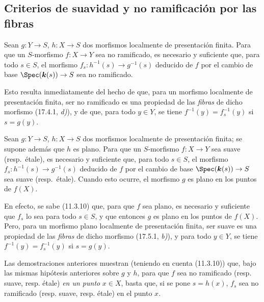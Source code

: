 \subsection{Criterios de suavidad y no ramificación por las fibras}
\label{subsection:IV.17.8}
\label{IV.17.8}

\begin{proposition}[17.8.1]
\label{IV.17.8.1}
Sean $g:Y\to S$, $h:X\to S$ dos morfismos localmente de presentación finita. Para que un $S$-morfismo $f:X\to Y$ sea no ramificado, es necesario y suficiente que, para todo $s\in S$, el morfismo $f_s:h^{-1}(s)\to g^{-1}(s)$ deducido de $f$ por el cambio de base $\Spec(\boldsymbol{k}(s))\to S$ sea no ramificado.
\end{proposition}

Esto resulta inmediatamente del hecho de que, para un morfismo localmente de presentación finita, ser no ramificado es una propiedad de las \emph{fibras} de dicho morfismo (17.4.1, \emph{d)}), y de que, para todo $y\in Y$, se tiene $f^{-1}(y)=f_s^{-1}(y)$ si $s=g(y)$.

\begin{proposition}[17.8.2]
\label{IV.17.8.2}
Sean $g:Y\to S$, $h:X\to S$ dos morfismos localmente de presentación finita; se supone además que $h$ es \textup{plano}. Para que un $S$-morfismo $f:X\to Y$ sea suave \textup{(resp.}\ étale\textup{)}, es necesario y suficiente que, para todo $s\in S$, el morfismo $f_s:h^{-1}(s)\to g^{-1}(s)$ deducido de $f$ por el cambio de base $\Spec(\boldsymbol{k}(s))\to S$ sea suave \textup{(resp.}\ étale\textup{)}. Cuando esto ocurre, el morfismo $g$ es plano en los puntos de $f(X)$.
\end{proposition}

En efecto, se sabe (11.3.10) que, para que $f$ sea plano, es necesario y suficiente que $f_s$ lo sea para todo $s\in S$, y que entonces $g$ es plano en los puntos de $f(X)$. Pero, para un morfismo plano localmente de presentación finita, ser suave es una propiedad de las \emph{fibras} de dicho morfismo (17.5.1, \emph{b)}), y para todo $y\in Y$, se tiene $f^{-1}(y)=f_s^{-1}(y)$ si $s=g(y)$.

\begin{remark}[17.8.3]
\label{IV.17.8.3}
Las demostraciones anteriores muestran (teniendo en cuenta (11.3.10)) que, bajo las mismas hipótesis anteriores sobre $g$ y $h$, para que $f$ sea no ramificado (resp. suave, resp. étale) \emph{en un punto} $x\in X$, basta que, si se pone $s=h(x)$, $f_s$ sea no ramificado (resp. suave, resp. étale) en el punto $x$.
\end{remark}
